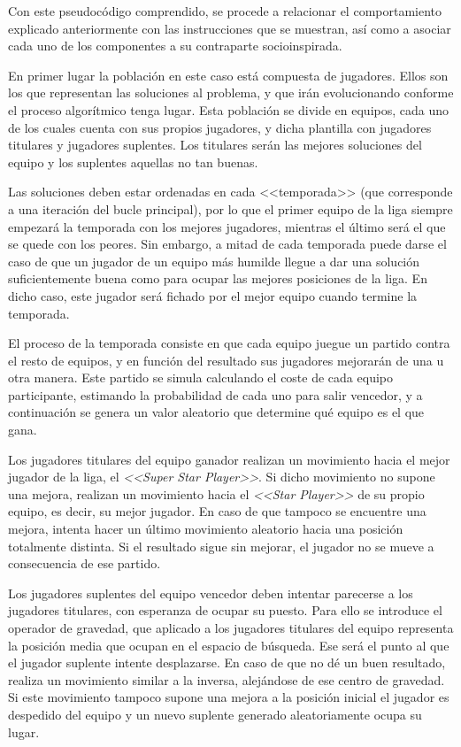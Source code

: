 Con este pseudocódigo comprendido, se procede a relacionar el comportamiento explicado anteriormente con las instrucciones que se muestran, así como a asociar cada uno de los componentes a su contraparte socioinspirada.

En primer lugar la población en este caso está compuesta de jugadores. Ellos son los que representan las soluciones al problema, y que irán evolucionando conforme el proceso algorítmico tenga lugar. Esta población se divide en equipos, cada uno de los cuales cuenta con sus propios jugadores, y dicha plantilla con jugadores titulares y jugadores suplentes. Los titulares serán las mejores soluciones del equipo y los suplentes aquellas no tan buenas.

Las soluciones deben estar ordenadas en cada <<temporada>> (que corresponde a una iteración del bucle principal), por lo que el primer equipo de la liga siempre empezará la temporada con los mejores jugadores, mientras el último será el que se quede con los peores. Sin embargo, a mitad de cada temporada puede darse el caso de que un jugador de un equipo más humilde llegue a dar una solución suficientemente buena como para ocupar las mejores posiciones de la liga. En dicho caso, este jugador será fichado por el mejor equipo cuando termine la temporada.

El proceso de la temporada consiste en que cada equipo juegue un partido contra el resto de equipos, y en función del resultado sus jugadores mejorarán de una u otra manera. Este partido se simula calculando el coste de cada equipo participante, estimando la probabilidad de cada uno para salir vencedor, y a continuación se genera un valor aleatorio que determine qué equipo es el que gana.

Los jugadores titulares del equipo ganador realizan un movimiento hacia el mejor jugador de la liga, el \textit{<<Super Star Player>>}. Si dicho movimiento no supone una mejora, realizan un movimiento hacia el \textit{<<Star Player>>} de su propio equipo, es decir, su mejor jugador. En caso de que tampoco se encuentre una mejora, intenta hacer un último movimiento aleatorio hacia una posición totalmente distinta. Si el resultado sigue sin mejorar, el jugador no se mueve a consecuencia de ese partido.

Los jugadores suplentes del equipo vencedor deben intentar parecerse a los jugadores titulares, con esperanza de ocupar su puesto. Para ello se introduce el operador de gravedad, que aplicado a los jugadores titulares del equipo representa la posición media que ocupan en el espacio de búsqueda. Ese será el punto al que el jugador suplente intente desplazarse. En caso de que no dé un buen resultado, realiza un movimiento similar a la inversa, alejándose de ese centro de gravedad. Si este movimiento tampoco supone una mejora a la posición inicial el jugador es despedido del equipo y un nuevo suplente generado aleatoriamente ocupa su lugar.

